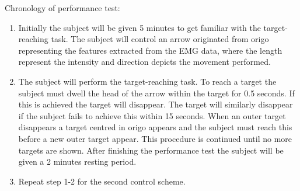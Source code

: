 Chronology of performance test:
\begin{enumerate}
	\item Initially the subject will be given 5 minutes to get familiar with the target-reaching task. The subject will control an arrow originated from origo representing the features extracted from the EMG data, where the length represent the intensity and direction depicts the movement performed.
	\item The subject will perform the target-reaching task. To reach a target the subject must dwell the head of the arrow within the target for 0.5 seconds. If this is achieved the target will disappear. The target will similarly disappear if the subject fails to achieve this within 15 seconds. When an outer target disappears a target centred in origo appears and the subject must reach this before a new outer target appear. This procedure is continued until no more targets are shown. After finishing the performance test the subject will be given a 2 minutes resting period.
	\item Repeat step 1-2 for the second control scheme. 
\end{enumerate}
 







